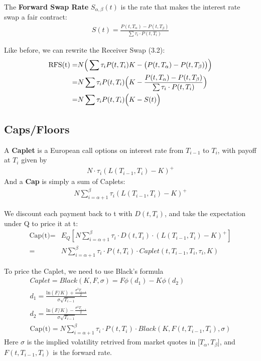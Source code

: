 \begin{definition}
    The \textbf{Forward Swap Rate} $S_{\alpha, \beta}(t)$ is the rate that makes the interest rate swap a fair contract:
    \begin{align*}
        S(t) = \frac{P(t, T_{\alpha}) - P(t, T_{\beta})}{\sum \tau_i \cdot P(t, T_i)}
    \end{align*}
\end{definition}

Like before, we can rewrite the Receiver Swap (3.2):
\begin{align*}
    \text{RFS(t)} =& N \Big( \sum \tau_i P(t, T_i)  K - \big(P(t, T_{\alpha}) - P(t, T_{\beta})\big) \Big) \notag \\
    =& N  \sum \tau_i P(t, T_i) \Big( K - \frac{P(t, T_{\alpha}) - P(t, T_{\beta})}{\sum \tau_i \cdot P(t, T_i)} \Big) \notag \\
    =& N  \sum \tau_i P(t, T_i) \Big( K - S(t) \Big)
\end{align*}

\subsection{Caps/Floors}
\begin{definition}
    A \textbf{Caplet} is a European call options on interest rate from $T_{i-1}$ to $T_i$, with payoff at $T_i$ given by
    \begin{align*}
        N \cdot \tau_i \left( L(T_{i-1}, T_i) - K \right)^+
    \end{align*}
    And a \textbf{Cap} is simply a sum of Caplets:
    \begin{align*}
        N \sum_{i = \alpha + 1}^{\beta} \tau_i \left( L(T_{i-1}, T_i) - K \right)^+
    \end{align*}
    
    We discount each payment back to t with  $D(t, T_i)$, and take the expectation under Q to price it at t:
    \begin{align}
        \text{Cap(t)} =& E_Q\left[ N \sum_{i = \alpha + 1}^{\beta} \tau_i \cdot D(t, T_i) \cdot \left( L(T_{i-1}, T_i) - K \right)^+ \right]  \\
        =& N \sum_{i = \alpha + 1}^{\beta} \tau_i \cdot P(t, T_i) \cdot Caplet(t, T_{i-1}, T_i, \tau_i, K)
    \end{align}
\end{definition}

To price the Caplet, we need to use Black's formula
\begin{align*}
    Caplet = Black(K, F, \sigma) = F \phi(d_1) - K \phi(d_2)\\
    d_1 = \frac{\text{ln}(F/K) + \frac{\sigma^2 T_{i-1}}{2}}{\sigma \sqrt{T_{i-1}}}\\
    d_2 = \frac{\text{ln}(F/K) - \frac{\sigma^2 T_{i-1}}{2}}{\sigma \sqrt{T_{i-1}}}\\
    \text{Cap(t)} = N \sum_{i = \alpha + 1}^{\beta} \tau_i \cdot P(t, T_i) \cdot Black(K, F(t,T_{i-1}, T_i) , \sigma)
\end{align*}
Here $\sigma$ is the implied volatility retrived from market quotes in [$T_\alpha, T_\beta$], and $F(t,T_{i-1}, T_i)$ is the forward rate.

